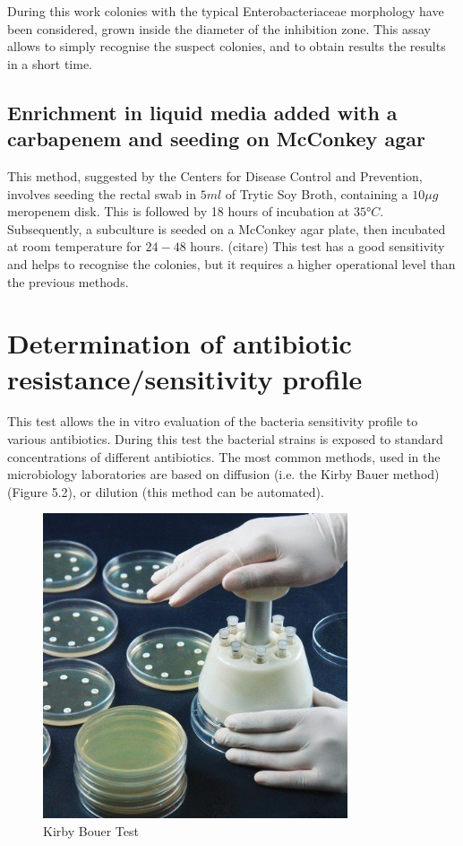 \documentclass[11pt]{report}
\begin{document}
During this work colonies with the typical Enterobacteriaceae morphology have been considered, grown inside the diameter of the inhibition zone.
This assay allows to simply recognise the suspect colonies, and to obtain results the results in a short time. 

\subsection{Enrichment in liquid media added with a carbapenem and seeding on McConkey agar}

This method, suggested by the Centers for Disease Control and Prevention, involves seeding the rectal swab in $5ml$ of Trytic Soy Broth, containing a $10\mu g$ meropenem disk.
This is followed by 18 hours of incubation at $35°C$.
Subsequently, a subculture is seeded on a McConkey agar plate, then incubated at room temperature for $24-48$ hours. (citare)
This test has a good sensitivity and helps to recognise the colonies, but it requires a higher operational level than the previous methods.

\section{Determination of antibiotic resistance/sensitivity profile}
This test allows the in vitro evaluation of the bacteria sensitivity profile to various antibiotics.
During this test the bacterial strains is exposed to standard concentrations of different antibiotics.
The most common methods, used in the microbiology laboratories are based on diffusion (i.e. the Kirby Bauer method) (Figure 5.2), or dilution (this method can be automated).

\begin{figure}[htp]
\centering
\includegraphics[scale=0.800]{immagini gamalero/Kirby_Bouer.jpg}
\caption{Kirby Bouer Test}
\label{}
\end{figure}
\end{document}
